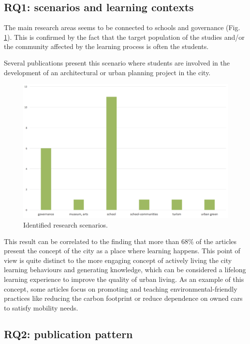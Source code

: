 \subsection*{RQ1: scenarios and learning contexts}

The main research areas seems to be connected to schools and governance (Fig. \ref{fig:scenarios}).
This is confirmed by the fact that the target population of the studies and/or the community affected by the learning process is often the students.

Several publications present this scenario where students are involved in the development of an architectural or urban planning project in the city\cite{seitamaa-hakkarainen_architecture_2012}\cite{ulrich_lets_2013}\cite{beckett_augmented_2005}.

\begin{figure}[htb]
\centering
\includegraphics[width=12cm]{img/scenario}
\caption{Identified research scenarios.}
\label{fig:scenarios}
\end{figure}

This result can be correlated to the finding that more than 68\% of the articles present the concept of the city as a place where learning happens. This point of view is quite distinct to the more engaging concept of actively living the city learning behaviours and generating knowledge, which can be considered a lifelong learning experience to improve the quality of urban living.
As an example of this concept, some articles focus on promoting and teaching environmental-friendly practices like reducing the carbon footprint\cite{evans_give_2014} or reduce dependence on owned cars to satisfy mobility needs\cite{valle_cloud_2011}.


\subsection*{RQ2: publication pattern}


